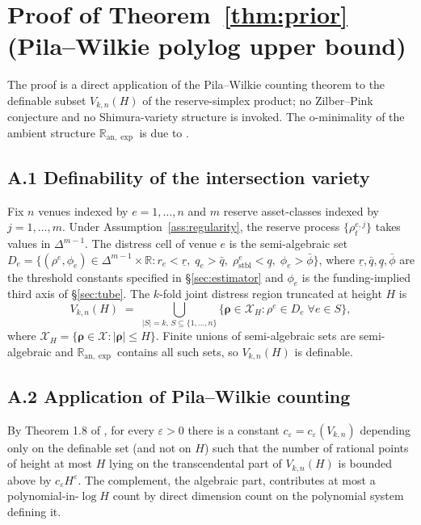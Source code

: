 \documentclass[12pt]{article}
\theoremstyle{sampledef}
\theoremstyle{sampleplain}
\theoremstyle{sampleremark}
\newcommand{\R}{\mathbb{R}}
\newcommand{\1}{\mathbf{1}}
\begin{document}
\section{Proof of Theorem~\ref{thm:prior} (Pila--Wilkie polylog
upper bound)}\label{app:thm-prior}

The proof is a direct application of the Pila--Wilkie counting
theorem \citep{PilaWilkie2006} to the definable subset $V_{k,n}(H)$
of the reserve-simplex product; no Zilber--Pink conjecture and no
Shimura-variety structure is invoked. The o-minimality of the
ambient structure $\R_{\mathrm{an},\exp}$ is due to
\citet{vandenDries1998Tame}.

\subsection*{A.1 Definability of the intersection variety}

Fix $n$ venues indexed by $e = 1, \dots, n$ and $m$ reserve
asset-classes indexed by $j = 1, \dots, m$. Under
Assumption~\ref{ass:regularity}, the reserve process
$\{\rho_t^{e,j}\}$ takes values in $\Delta^{m-1}$. The distress
cell of venue $e$ is the semi-algebraic set
$D_e = \{(\rho^e, \phi_e) \in \Delta^{m-1} \times \R :
r_e < \underline r,\; q_e > \bar q,\;
\rho^e_{\text{stbl}} < \underline q,\; \phi_e > \bar\phi\}$,
where $\underline r, \bar q, \underline q, \bar\phi$ are the
threshold constants specified in \S\ref{sec:estimator} and $\phi_e$
is the funding-implied third axis of \S\ref{sec:tube}. The $k$-fold joint
distress region truncated at height $H$ is
\[
V_{k,n}(H) \;=\; \bigcup_{|S|=k,\, S \subseteq \{1,\dots,n\}}
\{ \boldsymbol{\rho} \in \mathcal{X}_H :
\rho^e \in D_e \; \forall e \in S \},
\]
where $\mathcal{X}_H = \{\boldsymbol{\rho} \in \mathcal{X} :
|\boldsymbol{\rho}| \le H\}$. Finite unions of semi-algebraic sets
are semi-algebraic and $\R_{\mathrm{an},\exp}$ contains all such
sets, so $V_{k,n}(H)$ is definable.

\subsection*{A.2 Application of Pila--Wilkie counting}

By Theorem 1.8 of \citet{PilaWilkie2006}, for every $\varepsilon > 0$
there is a constant $c_\varepsilon = c_\varepsilon(V_{k,n})$
depending only on the definable set (and not on $H$) such that the
number of rational points of height at most $H$ lying on the
transcendental part of $V_{k,n}(H)$ is bounded above by
$c_\varepsilon H^{\varepsilon}$. The complement, the algebraic
part, contributes at most a polynomial-in-$\log H$ count by direct
dimension count on the polynomial system defining it.
\end{document}
